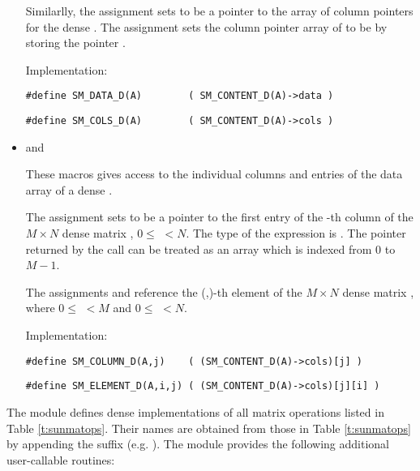 \begin{itemize}
  Similarlly, the assignment  sets  to be     
  a pointer to the array of column pointers for the dense  . 
  The assignment  sets the column pointer
  array of  to be  by storing the pointer .                   
  
  Implementation:

  \verb|#define SM_DATA_D(A)        ( SM_CONTENT_D(A)->data )|

  \verb|#define SM_COLS_D(A)        ( SM_CONTENT_D(A)->cols )|


\item {} and 
                                                            
  These macros gives access to the individual columns and entries of
  the data array of a dense .

  The assignment  sets  to be
  a pointer to the first entry of the -th column of the $M \times N$
  dense matrix , $0 \le$  $< N$.  The type of the
  expression  is .  The pointer
  returned by the call  can be treated as  
  an array which is indexed from $0$ to $M-1$.

  The assignments  and  reference the (,)-th element of the
  $M \times N$ dense matrix , where $0 \le$  $< M$ and
  $0\le $  $< N$.

  Implementation:

  \verb|#define SM_COLUMN_D(A,j)    ( (SM_CONTENT_D(A)->cols)[j] )|

  \verb|#define SM_ELEMENT_D(A,i,j) ( (SM_CONTENT_D(A)->cols)[j][i] )|

\end{itemize}
The {\sunmatdense} module defines dense implementations of all matrix
operations listed in Table \ref{t:sunmatops}. Their names are obtained
from those in Table \ref{t:sunmatops} by appending the
suffix  (e.g. ). 
The module {\sunmatdense} provides the following additional
user-callable routines: 

